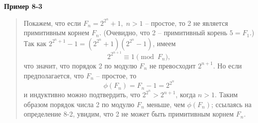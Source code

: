\documentclass[11pt]{article}
\begin{document}
\textbf{Пример 8-3}
\begin{quote}
	Покажем, что если $F_n=2^{2^n}+1, \;n>1$ -- простое, то 2 не является примитивным корнем $F_n$. (Очевидно, что 2 -- примитивный корень $5=F_1$.)
	Так как $2^{2^n+1}-1=(2^{2^n}+1)(2^{2^n}-1)$, имеем $$2^{2^{n+1}}\equiv1\pmod{F_n},$$ что значит, что порядок 2 по модулю $F_n$ не превосходит $2^{n+1}$. Но если предполагается, что $F_n$ -- простое, то $$\phi(F_n)=F_n-1=2^{2^n}$$ и индуктивно можно подтвердить, что $2^{2^n}>2^{n+1}$, когда $n>1$. Таким образом порядок числа 2 по модулю $F_n$ меньше, чем $\phi(F_n)$; ссылаясь на определение 8-2, увидим, что 2 не может быть примитивным корнем $F_n$.
\end{quote}
\end{document}
